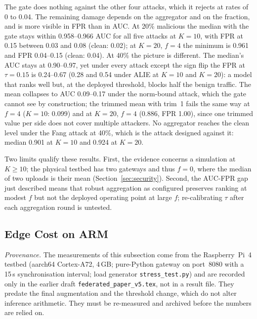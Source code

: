 The gate does nothing against the other four attacks, which it rejects at rates of 0 to 0.04. The remaining damage depends on the aggregator and on the fraction, and is more visible in FPR than in AUC. At 20\% malicious the median with the gate stays within 0.958--0.966 AUC for all five attacks at $K=10$, with FPR at 0.15 between 0.03 and 0.08 (clean: 0.02); at $K=20$, $f=4$ the minimum is 0.961 and FPR 0.04--0.15 (clean: 0.04). At 40\% the picture is different. The median's AUC stays at 0.90--0.97, yet under every attack except the sign flip the FPR at $\tau=0.15$ is 0.24--0.67 (0.28 and 0.54 under ALIE at $K=10$ and $K=20$): a model that ranks well but, at the deployed threshold, blocks half the benign traffic. The mean collapses to AUC 0.09--0.17 under the norm-bound attack, which the gate cannot see by construction; the trimmed mean with trim~1 fails the same way at $f=4$ ($K=10$: 0.099) and at $K=20$, $f=4$ (0.886, FPR 1.00), since one trimmed value per side does not cover multiple attackers. No aggregator reaches the clean level under the Fang attack at 40\%, which is the attack designed against it: median 0.901 at $K=10$ and 0.924 at $K=20$.

Two limits qualify these results. First, the evidence concerns a simulation at $K\ge10$; the physical testbed has two gateways and thus $f=0$, where the median of two uploads is their mean (Section~\ref{sec:security}). Second, the AUC-FPR gap just described means that robust aggregation as configured preserves ranking at modest $f$ but not the deployed operating point at large $f$; re-calibrating $\tau$ after each aggregation round is untested.

\subsection{Edge Cost on ARM}
\label{sec:eval-hardware}

\emph{Provenance.} The measurements of this subsection come from the Raspberry~Pi~4 testbed (aarch64 Cortex-A72, 4\,GB; pure-Python gateway on port~8080 with a 15\,s synchronisation interval; load generator \texttt{stress\_test.py}) and are recorded only in the earlier draft \texttt{federated\_paper\_v5.tex}, not in a result file. They predate the final augmentation and the threshold change, which do not alter inference arithmetic. They must be re-measured and archived before the numbers are relied on.

